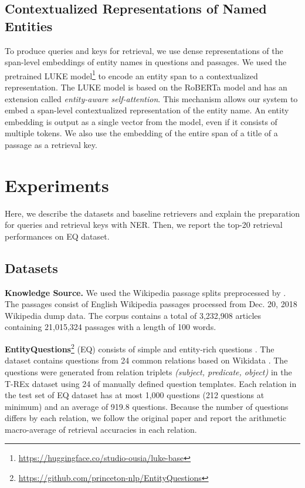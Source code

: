 \documentclass[letterpaper]{article} \usepackage{aaai23}  \usepackage{times}  \usepackage{helvet}  \usepackage{courier}  \usepackage[hyphens]{url}  \usepackage{graphicx} \urlstyle{rm} \def\UrlFont{\rm}  \usepackage{natbib}  \usepackage{caption} \frenchspacing  \setlength{\pdfpagewidth}{8.5in}  \setlength{\pdfpageheight}{11in}  \usepackage{algorithm}
\begin{document}
\subsection{Contextualized Representations of Named Entities}\label{sec:contextualized_entity}
To produce queries and keys for retrieval, we use dense representations of the span-level embeddings of entity names in questions and passages.
We used the pretrained LUKE model\footnote{\url{https://huggingface.co/studio-ousia/luke-base}} to encode an entity span to a contextualized representation.
The LUKE model is based on the RoBERTa model \citep{roberta} and has an extension called \textit{entity-aware self-attention}.
This mechanism allows our system to embed a span-level contextualized representation of the entity name.
An entity embedding is output as a single vector from the model, even if it consists of multiple tokens.
We also use the embedding of the entire span of a title of a passage as a retrieval key.


\section{Experiments}\label{sec:experiments}
Here, we describe the datasets and baseline retrievers and explain the preparation for queries and retrieval keys with NER.
Then, we report the top-20 retrieval performances on EQ dataset.

\subsection{Datasets}\label{sec:datasets}
\textbf{Knowledge Source.}
We used the Wikipedia passage splits preprocessed by \citet{karpukhin-etal-2020-dense}.
The passages consist of English Wikipedia passages processed from Dec. 20, 2018 Wikipedia dump data.
The corpus contains a total of 3,232,908 articles containing 21,015,324 passages with a length of 100 words.

\textbf{EntityQuestions}\footnote{\url{https://github.com/princeton-nlp/EntityQuestions}} (EQ) consists of simple and entity-rich questions \citep{sciavolino-etal-2021-simple}.
The dataset contains questions from 24 common relations based on Wikidata \citep{vrandevcic2014wikidata}.
The questions were generated from relation triplets \textit{(subject, predicate, object)} in the T-REx dataset \citep{elsahar-etal-2018-rex} using 24 of manually defined question templates.
Each relation in the test set of EQ dataset has at most 1,000 questions (212 questions at minimum) and an average of 919.8 questions.
Because the number of questions differs by each relation, we follow the original paper and report the arithmetic macro-average of retrieval accuracies in each relation.
\end{document}
